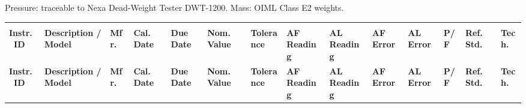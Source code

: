 
\begin{tcolorbox}[
  enhanced,
  colback=SubHeaderBg,
  colframe=SubHeaderBg,
  arc=4pt,
  boxrule=0pt,
  left=8pt, right=4pt, top=4pt, bottom=4pt
]
\hfill{\color{NexaSilver}\small Pressure: traceable to Nexa Dead-Weight Tester DWT-1200. Mass: OIML Class E2 weights.}
\end{tcolorbox}

\vspace{3pt}

\setlength{\arrayrulewidth}{0.4pt}

{\scriptsize
{}
\begin{longtable}{|C{1.5cm}|L{3.2cm}|C{1.5cm}|C{1.4cm}|C{1.4cm}|C{1.4cm}|C{1.4cm}|C{1.2cm}|C{1.4cm}|C{1.3cm}|C{1.4cm}|C{1.2cm}|C{1.4cm}|C{1.2cm}|}

\\
\color{white}\bfseries Instr.\ ID &
\color{white}\bfseries Description / Model &
\color{white}\bfseries Mfr. &
\color{white}\bfseries Cal.\ Date &
\color{white}\bfseries Due Date &
\color{white}\bfseries Nom.\ Value &
\color{white}\bfseries Tolerance &
\color{white}\bfseries AF Reading &
\color{white}\bfseries AL Reading &
\color{white}\bfseries AF Error &
\color{white}\bfseries AL Error &
\color{white}\bfseries P/F &
\color{white}\bfseries Ref.\ Std. &
\color{white}\bfseries Tech. \\
\endfirsthead
{}
\color{white}\bfseries Instr.\ ID &
\color{white}\bfseries Description / Model &
\color{white}\bfseries Mfr. &
\color{white}\bfseries Cal.\ Date &
\color{white}\bfseries Due Date &
\color{white}\bfseries Nom.\ Value &
\color{white}\bfseries Tolerance &
\color{white}\bfseries AF Reading &
\color{white}\bfseries AL Reading &
\color{white}\bfseries AF Error &
\color{white}\bfseries AL Error &
\color{white}\bfseries P/F &
\color{white}\bfseries Ref.\ Std. &
\color{white}\bfseries Tech. \\
\endhead


\end{longtable}}
